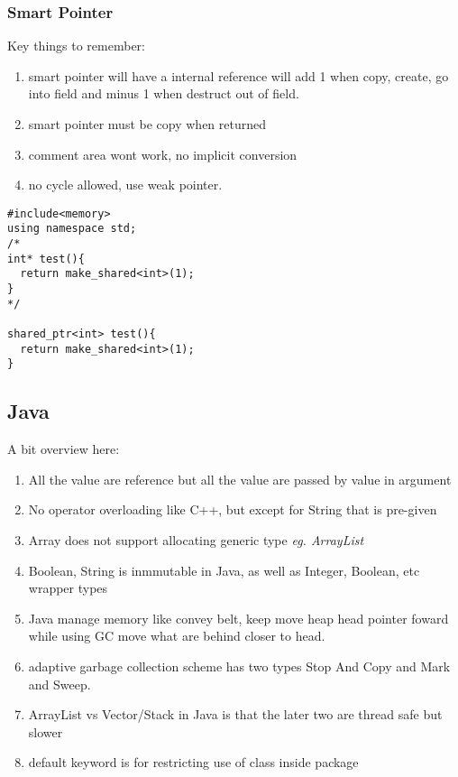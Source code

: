 \subsubsection{Smart Pointer}
Key things to remember:
\begin{enumerate}
\item smart pointer will have a internal reference will add 1 when copy, create, go into field and minus 1 when destruct out of field.
\item smart pointer must be copy when returned
\item comment area wont work, no implicit conversion
\item no cycle allowed, use weak pointer.
\end{enumerate}

\begin{lstlisting}
#include<memory>
using namespace std;
/*
int* test(){
  return make_shared<int>(1);
}
*/

shared_ptr<int> test(){
  return make_shared<int>(1);
}
\end{lstlisting}

\subsection{Java}
A bit overview here:
\begin{enumerate}
\item All the value are reference but all the value are passed by value in argument
\item No operator overloading like C++, but {\color{red} except for String that is pre-given}
\item Array does not support allocating generic type \textit{eg. ArrayList}
\item Boolean, String is inmmutable in Java, as well as {\color{blue} Integer, Boolean, etc} wrapper types
\item Java manage memory like convey belt, keep move heap head pointer foward while using GC move what are behind closer to head.
\item {\color{blue} adaptive garbage collection scheme} has two types {\color{blue} Stop And Copy} and {\color{blue} Mark and Sweep}.
\item ArrayList vs Vector/Stack in Java is that the later two are thread safe but slower
\item {\color{blue}default} keyword is for restricting use of class inside package
\
\end{enumerate}

